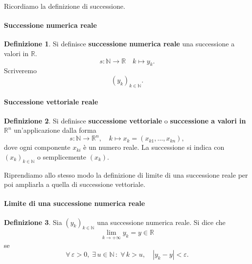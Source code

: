 \documentclass{article}
\theoremstyle{plain}
\theoremstyle{definition}
\newtheorem{defn}{Definizione}[section]
\theoremstyle{remark}
\begin{document}
\vspace{10pt}

Ricordiamo la definizione di successione.

\vspace{10pt}

\paragraph{Successione numerica reale}
\begin{bxthm}
\begin{defn}
    Si definisce \textbf{successione numerica reale} una successione a valori in $\mathbb{R}$.
    \[s:\mathbb{N}\to \mathbb{R}\quad k\mapsto y_k.\]
    Scriveremo \[(y_k)_{k\in\mathbb{N}}.\]
\end{defn}
\end{bxthm}

\vspace{10pt}

\paragraph{Successione vettoriale reale}
\begin{bxthm}
\begin{defn}
    Si definisce \textbf{successione vettoriale} o \textbf{successione a valori in $\mathbb{R}^n$} un'applicazione dalla forma
    \[s:\mathbb{N}\to\mathbb{R}^n, \quad k\mapsto x_k=(x_{k1},\ldots,x_{kn}),\]
    dove ogni componente $x_{ki}$ è un numero reale. La successione si indica con $(x_k)_{k\in\mathbb{N}}$ o semplicemente $(x_k)$.
\end{defn}
\end{bxthm}

\vspace{10pt}

Riprendiamo allo stesso modo la definizione di limite di una successione reale per poi ampliarla a quella di successione vettoriale.

\vspace{10pt}

\paragraph{Limite di una successione numerica reale}
\begin{bxthm}
\begin{defn}
    Sia $(y_k)_{k\in\mathbb{N}}$ una successione numerica reale. Si dice che 
    \[\lim_{k\to+\infty} y_k = y \in \mathbb{R}\]
    se \[\forall\,\varepsilon>0,\; \exists\, u\in\mathbb{N}\,:\;\forall\, k>u,\quad |y_k-y|<\varepsilon.\]
\end{defn}
\end{bxthm}
\end{document}
